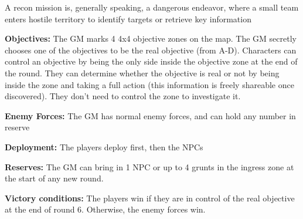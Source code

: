  A recon mission is, generally speaking, a dangerous endeavor, where a small team enters hostile territory to identify targets or retrieve key information

 \textbf{Objectives:} The GM marks 4 4x4 objective zones on the map. The GM secretly chooses one of the objectives to be the real objective (from A-D). Characters can control an objective by being the only side inside the objective zone at the end of the round. They can determine whether the objective is real or not by being inside the zone and taking a full action (this information is freely shareable once discovered). They don’t need to control the zone to investigate it.

 \textbf{Enemy Forces:} The GM has normal enemy forces, and can hold any number in reserve

 \textbf{Deployment:} The players deploy first, then the NPCs

 \textbf{Reserves:} The GM can bring in 1 NPC or up to 4 grunts in the ingress zone at the start of any new round.

 \textbf{Victory conditions:} The players win if they are in control of the real objective at the end of round 6. Otherwise, the enemy forces win.
